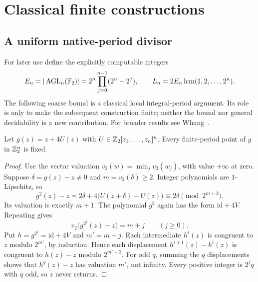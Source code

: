 \section{Classical finite constructions}

\subsection{A uniform native-period divisor}
\label{sec:period}

For later use define the explicitly computable integers
\begin{equation}
 E_n=|\operatorname{AGL}_n(\mathbb F_2)|
     =2^n\prod_{j=0}^{n-1}(2^n-2^j),\qquad
 L_n=2E_n\operatorname{lcm}(1,2,\ldots,2^n).
 \label{eq:period-divisor}
\end{equation}
The following coarse bound is a classical local integral-period
argument. Its role is only to make the subsequent construction finite;
neither the bound nor general decidability is a new contribution.
For broader results see Whang~\cite{whang2023}.

\begin{lemma}
\label{lem:near-identity}
Let $g(z)=z+4U(z)$ with $U\in\mathbb Z_2[z_1,\ldots,z_n]^n$.
Every finite-period point of $g$ in $\mathbb Z_2^n$ is fixed.
\end{lemma}
\begin{proof}
Use the vector valuation $v_2(w)=\min_jv_2(w_j)$, with value
$+\infty$ at zero. Suppose $\delta=g(z)-z\ne0$ and
$m=v_2(\delta)\ge2$. Integer polynomials are $1$-Lipschitz, so
\[
 g^2(z)-z=2\delta+4\bigl(U(z+\delta)-U(z)\bigr)
          \equiv2\delta\pmod{2^{m+2}}.
\]
Its valuation is exactly $m+1$. The polynomial $g^2$ again has
the form $\mathrm{id}+4V$. Repeating gives
\[
 v_2\bigl(g^{2^j}(z)-z\bigr)=m+j\qquad(j\ge0).
\]
Put $h=g^{2^j}=\mathrm{id}+4V$ and $m'=m+j$. Each intermediate
$h^i(z)$ is congruent to $z$ modulo $2^{m'}$, by induction. Hence
each displacement $h^{i+1}(z)-h^i(z)$ is congruent to $h(z)-z$
modulo $2^{m'+2}$. For odd $q$, summing the $q$ displacements
shows that $h^q(z)-z$ has valuation $m'$, not infinity.
Every positive integer is $2^jq$ with $q$ odd, so $z$ never returns.
\end{proof}

